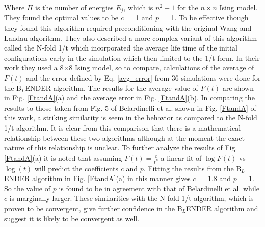 \documentclass[aps,pre,reprint,superscriptaddress,showkeys]{revtex4-1}
\begin{document}
Where $\Pi$ is the number of energies $E_j$, which is ${n^2} -1$ for the $n\times n$  Ising model.   They found the optimal values to be $c=$ 1 and $p=$ 1. To be effective though they found this algorithm required preconditioning with the original Wang and Landau algorithm. They also described a more complex variant of this algorithm called the N-fold 1/t  which incorporated the average life time of the initial configurations early in the simulation which then limited to the 1/t form. In their work they used a 8$\times$8 Ising model, so to compare, calculations of the average of $F(t)$ and the error defined by Eq. \ref{avg_error} from 36 simulations were done for the B$_L$ENDER algorithm. The results for the average value of $F(t)$ are shown in  Fig. \ref{FtandA}(a) and the average error in Fig. \ref{FtandA}(b). In comparing the results to those taken from Fig. 5 of Belardinelli et al. \cite{saturation} shown in   Fig. \ref{FtandA} of this work, a striking similarity is seem in the behavior as compared to the N-fold 1/t algorithm. It is clear from this comparison that there is a mathematical relationship between these two algorithms although at the moment the exact nature of this relationship is unclear.  To further analyze the results of  Fig. \ref{FtandA}(a) it is noted that assuming $F(t) = \frac{c}{t^p}$  a linear fit of  $\log F(t)$ vs $\log(t)$ will predict the coefficients $c$ and $p$. Fitting the results from the B$_L$ENDER algorithm in Fig. \ref{FtandA}(a) in this manner gives $c=$ 1.8 and $p=$ 1. So the value of $p$ is found to be in agreement with that of Belardinelli et al. while $c$ is marginally larger. These similarities with the N-fold 1/t algorithm, which is proven to be convergent, give further confidence in the B$_L$ENDER algorithm and suggest it is likely to be convergent as well.
\end{document}
